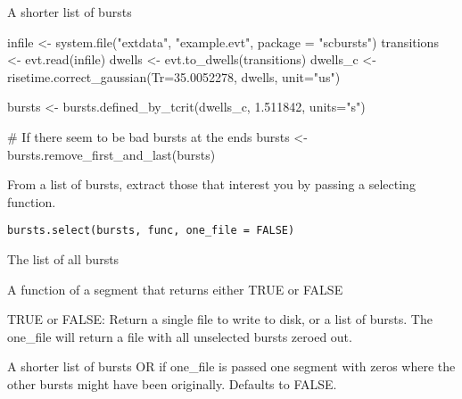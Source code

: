 \documentclass[letterpaper]{book}
\begin{document}
%
\begin{Value}
A shorter list of bursts
\end{Value}
%
\begin{Examples}
\begin{ExampleCode}

infile <- system.file("extdata", "example.evt", package = "scbursts")
transitions <- evt.read(infile)
dwells <- evt.to_dwells(transitions)
dwells_c <- risetime.correct_gaussian(Tr=35.0052278, dwells, unit="us")

bursts <- bursts.defined_by_tcrit(dwells_c, 1.511842, units="s")

# If there seem to be bad bursts at the ends
bursts <- bursts.remove_first_and_last(bursts)

\end{ExampleCode}
\end{Examples}
%
\begin{Description}\relax
From a list of bursts, extract those that interest you by passing a selecting function.
\end{Description}
%
\begin{Usage}
\begin{verbatim}
bursts.select(bursts, func, one_file = FALSE)
\end{verbatim}
\end{Usage}
%
\begin{Arguments}
\begin{ldescription}
\item[\code{bursts}] The list of all bursts

\item[\code{func}] A function of a segment that returns either TRUE or FALSE

\item[\code{one\_file}] TRUE or FALSE: Return a single file to write to disk, or a list of bursts.
The one\_file will return a file with all unselected bursts zeroed out.
\end{ldescription}
\end{Arguments}
%
\begin{Value}
A shorter list of bursts OR if one\_file is passed one segment with zeros where the other bursts might have been originally. Defaults to FALSE.
\end{Value}
%
\end{document}
